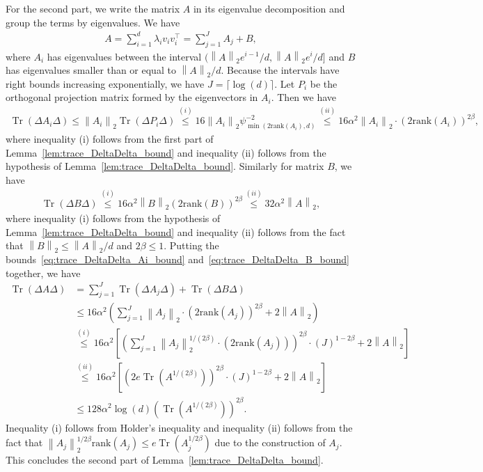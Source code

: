 \documentclass[11pt,twoside]{article}
\newcommand{\isoperi}{\psi}
\theoremstyle{named}
\theoremstyle{plain}
\newcommand{\vecnorm}[2]{\left\| #1\right\|_{#2}}
\newcommand{\usedim}{\ensuremath{d}}
\newcommand{\dims}{\usedim}
\DeclareMathOperator{\trace}{Tr}
\newcommand{\brackets}[1]{\left[ #1 \right]}
\newcommand{\parenth}[1]{\left( #1 \right)}
\newcommand{\tp}{^\top}
\begin{document}
For the second part, we write the matrix $A$ in its eigenvalue decomposition and group the terms by eigenvalues. We have
\begin{align*}
  A = \sum_{i=1}^\dims \lambda_i v_i v_i\tp = \sum_{j=1}^J A_j + B,
\end{align*}
where $A_i$ has eigenvalues between the interval $(\vecnorm{A}{2} e^{i-1} /\dims, \vecnorm{A}{2} e^{i} /\dims]$ and $B$ has eigenvalues smaller than or equal to $\vecnorm{A}{2}/\dims$. Because the intervals have right bounds increasing exponentially, we have $J = \lceil \log(\dims) \rceil$. Let $P_i$ be the orthogonal projection matrix formed by the eigenvectors in $A_i$. Then we have
\begin{align}
  \label{eq:trace_DeltaDelta_Ai_bound}
  \trace\parenth{\Delta A_i \Delta} \leq \vecnorm{A_i}{2} \trace\parenth{\Delta P_i \Delta} \stackrel{(i)}{\leq} 16 \vecnorm{A_i}{2} \isoperi^{-2}_{\min(2 \text{rank}(A_i), \dims)} \stackrel{(ii)}{\leq} 16 \alpha^2 \vecnorm{A_i}{2} \cdot \parenth{2 \text{rank}(A_i)}^{2\beta},
\end{align}
where inequality (i) follows from the first part of Lemma~\ref{lem:trace_DeltaDelta_bound} and inequality (ii) follows from the hypothesis of Lemma~\ref{lem:trace_DeltaDelta_bound}.
Similarly for matrix $B$, we have
\begin{align}
  \label{eq:trace_DeltaDelta_B_bound}
  \trace\parenth{\Delta B \Delta} \stackrel{(i)}{\leq} 16 \alpha^2 \vecnorm{B}{2} \parenth{2\text{rank}(B)}^{2\beta} \stackrel{(ii)}{\leq} 32 \alpha^2 \vecnorm{A}{2},
\end{align}
where inequality (i) follows from the hypothesis of Lemma~\ref{lem:trace_DeltaDelta_bound} and inequality (ii) follows from the fact that $\vecnorm{B}{2} \leq \vecnorm{A}{2}/d$ and $2\beta \leq 1$.
Putting the bounds~\eqref{eq:trace_DeltaDelta_Ai_bound} and~\eqref{eq:trace_DeltaDelta_B_bound} together, we have
\begin{align*}
  \trace\parenth{\Delta A \Delta} &= \sum_{j=1}^J \trace\parenth{\Delta A_j\Delta} + \trace\parenth{\Delta  B \Delta} \\
  &\leq 16 \alpha^2 \parenth{\sum_{j=1}^J \vecnorm{A_j}{2} \cdot \parenth{2\text{rank}(A_j)}^{2\beta} + 2\vecnorm{A}{2}} \\
  &\stackrel{(i)}{\leq} 16 \alpha^2 \brackets{\parenth{\sum_{j=1}^J \vecnorm{A_j}{2}^{1/(2\beta)} \cdot \parenth{2\text{rank}(A_j)}}^{2\beta} \cdot \parenth{J}^{1-2\beta} +  2\vecnorm{A}{2}}\\
  &\stackrel{(ii)}{\leq} 16 \alpha^2\brackets{\parenth{2 e \trace\parenth{A^{1/(2\beta)}}}^{2\beta} \cdot \parenth{J}^{1-2\beta} + 2 \vecnorm{A}{2}} \\
  &\leq 128 \alpha^2 \log(\dims) \parenth{\trace\parenth{A^{1/(2\beta)}}}^{2\beta}.
\end{align*}
Inequality (i) follows from Holder's inequality and inequality (ii) follows from the fact that $\vecnorm{A_j}{2}^{1/2\beta} \text{rank}(A_j) \leq e \trace\parenth{A_{j}^{1/2\beta}}$ due to the construction of $A_j$. This concludes the second part of Lemma~\ref{lem:trace_DeltaDelta_bound}.
\end{document}
